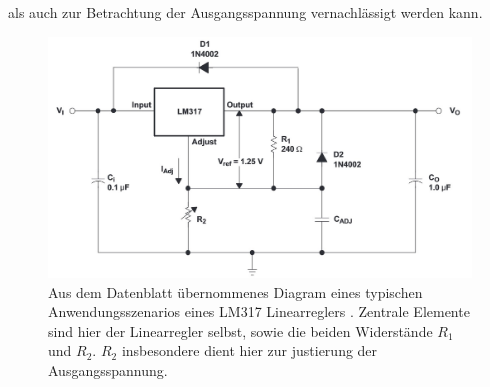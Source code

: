 	als auch zur Betrachtung der Ausgangsspannung vernachlässigt werden kann.
	\begin{figure}[h]
		\centering
		\includegraphics[width=.9\textwidth]{referenzen/typical_app_schem.jpg}
		\caption{Aus dem Datenblatt übernommenes Diagram eines typischen Anwendungsszenarios eines LM317 Linearreglers \cite{datasheet.LM317.TexasInstruments.2021}. Zentrale Elemente sind hier der Linearregler selbst, sowie
		die beiden Widerstände \(R_1\) und \(R_2\). \(R_2\) insbesondere dient hier zur justierung der Ausgangsspannung.}
		\label{fig:typical app sch}
	\end{figure}